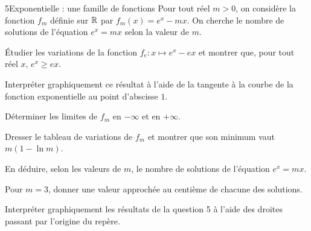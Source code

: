 \begin{exoBac}{5}{Exponentielle : une famille de fonctions}
Pour tout réel $m>0$, on considère la fonction $f_m$ définie sur $\mathbb{R}$ par $f_m(x)=e^{x}-mx$. On cherche le nombre de solutions de
l'équation $e^{x}=mx$ selon la valeur de $m$.
\begin{questions}
  \item Étudier les variations de la fonction $f_e:x\mapsto e^{x}-ex$ et montrer que, pour tout réel $x$, $e^{x}\geq ex$.
  \item Interpréter graphiquement ce résultat à l'aide de la tangente à la courbe de la fonction exponentielle au point d'abscisse $1$.
\end{questions}
\begin{questions}[resume]
  \item Déterminer les limites de $f_m$ en $-\infty$ et en $+\infty$.
  \item Dresser le tableau de variations de $f_m$ et montrer que son minimum vaut $m(1-\ln m)$.
  \item En déduire, selon les valeurs de $m$, le nombre de solutions de l'équation $e^{x}=mx$.
  \item Pour $m=3$, donner une valeur approchée au centième de chacune des solutions.
  \item Interpréter graphiquement les résultats de la question 5 à l'aide des droites passant par l'origine du repère.
\end{questions}
\end{exoBac}

